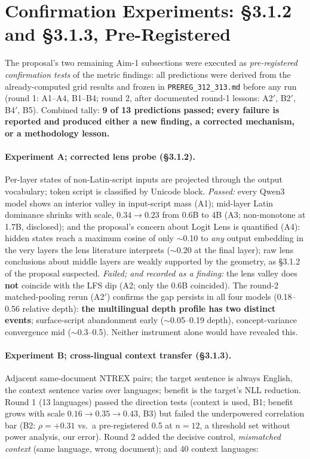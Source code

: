 \documentclass[11pt,a4paper]{article}
\begin{document}
\section{Confirmation Experiments: \S3.1.2 and \S3.1.3, Pre-Registered}
\label{sec:confirm}
The proposal's two remaining Aim-1 subsections were executed as
\emph{pre-registered confirmation tests} of the metric findings: all
predictions were derived from the already-computed grid results and frozen in
\texttt{PREREG\_312\_313.md} before any run (round 1: A1--A4, B1--B4; round 2,
after documented round-1 lessons: A2$'$, B2$'$, B4$'$, B5). Combined tally:
\textbf{9 of 13 predictions passed; every failure is reported and produced
either a new finding, a corrected mechanism, or a methodology lesson.}

\paragraph{Experiment A; corrected lens probe (\S3.1.2).}
Per-layer states of non-Latin-script inputs are projected through the output
vocabulary; token script is classified by Unicode block.
\emph{Passed:} every Qwen3 model shows an interior valley in input-script
mass (A1); mid-layer Latin dominance shrinks with scale, $0.34 \to 0.23$ from
0.6B to 4B (A3; non-monotone at 1.7B, disclosed); and the proposal's concern
about Logit Lens is quantified (A4): hidden states reach a maximum cosine of
only $\sim$0.10 to \emph{any} output embedding in the very layers the lens
literature interprets ($\sim$0.20 at the final layer); raw lens conclusions
about middle layers are weakly supported by the geometry, as \S3.1.2 of the
proposal suspected.
\emph{Failed; and recorded as a finding:} the lens valley does
\textbf{not} coincide with the LFS dip (A2; only the 0.6B coincided).
The round-2 matched-pooling rerun (A2$'$) confirms the gap persists in all
four models (0.18--0.56 relative depth): \textbf{the multilingual depth profile has
two distinct events}; surface-script abandonment early ($\sim$0.05--0.19
depth), concept-variance convergence mid ($\sim$0.3--0.5). Neither instrument
alone would have revealed this.

\paragraph{Experiment B; cross-lingual context transfer (\S3.1.3).}
Adjacent same-document NTREX pairs; the target sentence is always English,
the context sentence varies over languages; benefit is the target's NLL
reduction. Round 1 (13 languages) passed the direction tests (context is
used, B1; benefit grows with scale $0.16 \to 0.35 \to 0.43$, B3) but failed
the underpowered correlation bar (B2: $\rho = +0.31$ vs.\ a pre-registered
0.5 at $n{=}12$, a threshold set without power analysis, our error).
Round 2 added the decisive control, \emph{mismatched context} (same
language, wrong document); and 40 context languages:
\end{document}
